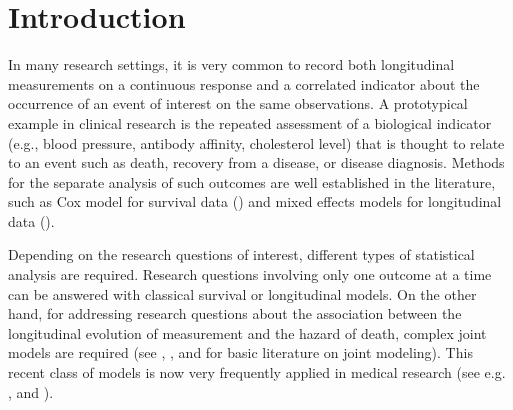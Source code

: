 \documentclass[12pt]{article}
\begin{document}
\clearpage

\section{Introduction}

In many research settings, it is very common to record both longitudinal measurements on a continuous response and a correlated indicator about the occurrence of an event of interest on the same observations. A prototypical example in clinical research is the repeated assessment of a biological indicator (e.g., blood pressure, antibody affinity, cholesterol level) that is thought to relate to an event such as death, recovery from a disease, or disease diagnosis. Methods for the separate analysis of such outcomes are well established in the literature, such as Cox model for survival data (\cite{cox1972}) and mixed effects models for longitudinal data (\cite{mcculloch2004generalized}).

Depending on the research questions of interest, different types of statistical analysis are required. Research questions involving only one outcome at a time can be answered with classical survival or longitudinal models. On the other hand, for addressing research questions about the association between the longitudinal evolution of measurement and the hazard of death, complex joint models are required (see \cite{Wulfsohn1997}, \cite{Song_2002}, \cite{Henderson2000} and \cite{rizopoulos_book} for basic literature on joint modeling). This recent class of models is now very frequently applied in medical research (see e.g. \cite{sene_shared_2014}, \cite{brown2003bayesian} and \cite{he2016joint}).
\end{document}
